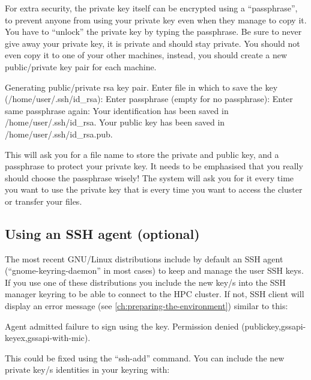   For extra security, the private key itself can be encrypted using a ``passphrase'',
  to prevent anyone from using your private key even when they manage to copy
  it. You have to ``unlock'' the private key by typing the passphrase.
  Be sure to never give away your private key, it is private and should stay private.
  You should not even copy it to one of your other machines, instead, you should create a
  new public/private key pair for each machine.

\begin{prompt}
Generating public/private rsa key pair.
Enter file in which to save the key (/home/user/.ssh/id_rsa):
Enter passphrase (empty for no passphrase):
Enter same passphrase again:
Your identification has been saved in /home/user/.ssh/id_rsa.
Your public key has been saved in /home/user/.ssh/id_rsa.pub.
\end{prompt}

  This will ask you for a file name to store the private and public key, and a
  passphrase to protect your private key. It needs to be emphasised that you
  really should choose the passphrase wisely! The system will ask you for it
  every time you want to use the private key that is every time you want to
  access the cluster or transfer your files.

\fi %

\iflinux

\subsection{Using an SSH agent (optional)}
\label{sec:using-ssh-agent-with-openssh}
  The most recent GNU/Linux distributions include by default an SSH agent
  (``gnome-keyring-daemon'' in most cases) to keep and manage the user SSH keys.
  If you use one of these distributions you  include the new key/s into
  the SSH manager keyring to be able to connect to the HPC cluster. If not,
  SSH client will display an error message (see \autoref{ch:preparing-the-environment})
  similar to this:

  \begin{flattext}
   Agent admitted failure to sign using the key.
   Permission denied (publickey,gssapi-keyex,gssapi-with-mic).
  \end{flattext}

  This could be fixed using the ``ssh-add'' command.
  You can include the new private key/s identities in your keyring with:
\begin{prompt}
\end{prompt}

